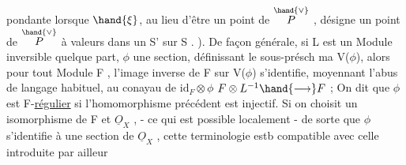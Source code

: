 pondante lorsque $\hand{\xi}$, au lieu d'\^etre un point de $\overset{\hand{\vee}}{P}$ , d\'esigne un point
de $\overset{\hand{\vee}}{P}$ \`a valeurs dans un S' sur S . ). \hand{\unsure{(}}De fa\c{c}on g\'en\'erale, si L est un
Module inversible quelque part, $\phi$ une section, d\'efinissant le sous-pr\'esch
ma V($\phi$), alors pour tout Module F , l'image inverse de F sur V($\phi$)
s'identifie, moyennant l'abus de langage habituel, au conayau de $\mathrm{id}_F\otimes\phi$
$F\otimes L^{-1} \hand{\longrightarrow} F$ ; On dit que $\phi$ est F-\uline{r\'egulier} si l'homomorphisme pr\'ec\'edent
est injectif. Si on choisit un isomorphisme de F et $\underline{O}_X$ , - ce qui
est possible localement - de sorte que $\phi$ s'identifie \`a une section de
$\underline{O}_X$ , cette terminologie estb compatible avec celle  introduite par ailleur

